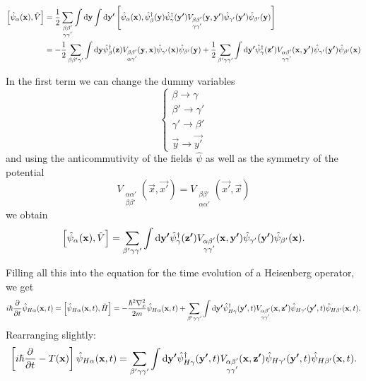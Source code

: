 \begin{align*}
\left[\hat{\psi}_\alpha(\bm{\mathrm{x}}), \hat{V}\right] &= \frac{1}{2} \sum_{\substack{\beta \beta' \\ \gamma \gamma'}}\int \operatorname{d \!}{\bm{\mathrm{y}}}\int \operatorname{d \!}{\bm{\mathrm{y'}}} \left[\hat{\psi}_\alpha(\bm{\mathrm{x}}), \hat{\psi}^\dagger_\beta(\bm{\mathrm{y}})\hat{\psi}^\dagger_\gamma(\bm{\mathrm{y'}})V_{\substack{\beta \beta' \\ \gamma \gamma'}}(\bm{\mathrm{y}}, \bm{\mathrm{y'}})\hat{\psi}_{\gamma'}(\bm{\mathrm{y'}})\hat{\psi}_{\beta'}(\bm{\mathrm{y}})\right] \\
&= - \frac{1}{2}\sum_{\beta\beta'\gamma'}\int \operatorname{d \!}{\bm{\mathrm{y}}}\hat{\psi}^\dagger_\beta(\bm{\mathrm{z}})V_{\substack{\beta\beta' \\ \alpha\gamma'}}(\bm{\mathrm{y}}, \bm{\mathrm{x}})\hat{\psi}_{\gamma'}(\bm{\mathrm{x}})\hat{\psi}_{\beta'}(\bm{\mathrm{y}}) + \frac{1}{2}\sum_{\beta'\gamma\gamma'}\int \operatorname{d \!}{\bm{\mathrm{y'}}}\hat{\psi}^\dagger_\gamma(\bm{\mathrm{z'}})V_{\substack{\alpha\beta' \\ \gamma\gamma'}}(\bm{\mathrm{x}}, \bm{\mathrm{y'}})\hat{\psi}_{\gamma'}(\bm{\mathrm{y'}})\hat{\psi}_{\beta'}(\bm{\mathrm{x}})
\end{align*}

In the first term we can change the dummy variables
\[ \begin{cases}
\beta \to \gamma \\
\beta' \to \gamma' \\
\gamma' \to \beta' \\
\vec{y} \to \vec{y'}
\end{cases} \]
and using the anticommutivity of the fields $\hat{\psi}$ as well as the symmetry of the potential
\[ V_{\substack{\alpha\alpha' \\ \beta \beta'}}(\vec{x}, \vec{x'}) = V_{\substack{\beta \beta' \\ \alpha\alpha'}}(\vec{x'}, \vec{x}) \]
we obtain
\[ \left[\hat{\psi}_\alpha(\bm{\mathrm{x}}), \hat{V}\right] = \sum_{\beta'\gamma\gamma'}\int \operatorname{d \!}{\bm{\mathrm{y'}}}\hat{\psi}^\dagger_\gamma(\bm{\mathrm{z'}})V_{\substack{\alpha\beta' \\ \gamma\gamma'}}(\bm{\mathrm{x}}, \bm{\mathrm{y'}})\hat{\psi}_{\gamma'}(\bm{\mathrm{y'}})\hat{\psi}_{\beta'}(\bm{\mathrm{x}}). \]

Filling all this into the equation for the time evolution of a Heisenberg operator, we get
\[ i\hbar  \frac{\partial{^{}}}{\partial{{t}^{}}} \hat{\psi}_{H\alpha}(\bm{\mathrm{x}},t) = \left[\hat{\psi}_{H\alpha}(\bm{\mathrm{x}},t),\hat{H}\right] = - \frac{\hbar^2 \nabla^2_x}{2m}\hat{\psi}_{H\alpha}(\bm{\mathrm{x}},t) + \sum_{\beta'\gamma\gamma'} \int \operatorname{d \!}{\bm{\mathrm{y'}}}\hat{\psi}^\dagger_{H\gamma}(\bm{\mathrm{y'}},t)V_{\substack{\alpha\beta' \\ \gamma \gamma'}}(\bm{\mathrm{x}}, \bm{\mathrm{z'}})\hat{\psi}_{H\gamma'}(\bm{\mathrm{y'}},t)\hat{\psi}_{H\beta'}(\bm{\mathrm{x}},t). \]
Rearranging slightly:
\[ \left[ i\hbar  \frac{\partial{^{}}}{\partial{{t}^{}}}  - T(\bm{\mathrm{x}})\right] \hat{\psi}_{H\alpha}(\bm{\mathrm{x}},t) =  \sum_{\beta'\gamma\gamma'} \int \operatorname{d \!}{\bm{\mathrm{y'}}}\hat{\psi}^\dagger_{H\gamma}(\bm{\mathrm{y'}},t)V_{\substack{\alpha\beta' \\ \gamma \gamma'}}(\bm{\mathrm{x}}, \bm{\mathrm{z'}})\hat{\psi}_{H\gamma'}(\bm{\mathrm{y'}},t)\hat{\psi}_{H\beta'}(\bm{\mathrm{x}},t). \]


